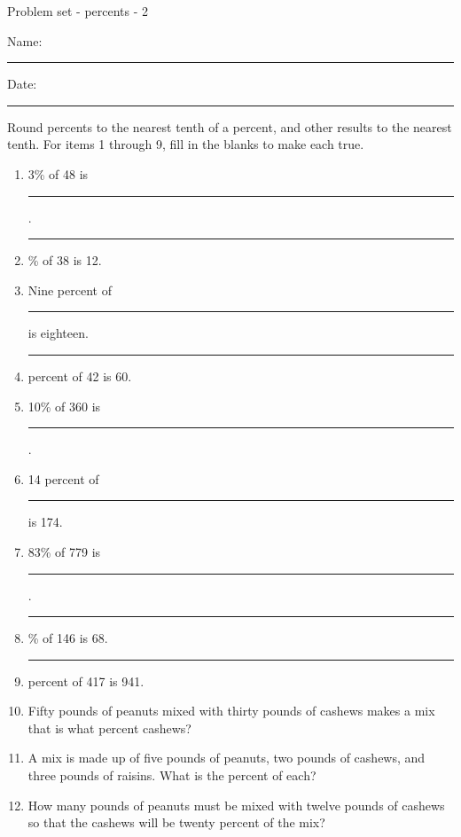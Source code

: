 \documentclass[12pt]{article}
\begin{document}
\pagestyle{empty} %
\begin{center}
          Problem set - percents - 2 \\[0.5in]
\end{center}
Name: \rule{4.5in}{0.005in} Date: \rule{1in}{0.005in} 
  \vspace{0.25in}

Round percents to the nearest tenth of a percent, and other results to the nearest tenth. For items 1 through 9, fill in the blanks to make each true. 

\begin{enumerate}
		\newcommand{\spacing}{\vspace{0.50in}}

\item 3\% of 48 is \rule{0.5in}{0.005in}.
  \spacing

\item \rule{0.5in}{0.005in}\% of 38 is 12.
  \spacing

\item Nine percent of \rule{1.5in}{0.005in} is eighteen.
  \spacing

\item \rule{0.5in}{0.005in} percent of 42 is 60.
  \spacing

\item 10\% of 360 is \rule{0.5in}{0.005in}.
  \spacing

\item 14 percent of \rule{0.5in}{0.005in} is 174.
  \spacing

\item 83\% of 779 is \rule{0.5in}{0.005in}.
  \spacing

\item \rule{0.5in}{0.005in}\% of 146 is 68.
  \spacing

\item \rule{0.5in}{0.005in} percent of 417 is 941.
  \spacing

\item Fifty pounds of peanuts mixed with thirty pounds of cashews makes a mix that is what percent cashews? 
  \spacing

\item A mix is made up of five pounds of peanuts, two pounds of cashews, and three pounds of raisins. What is the percent of each? 
  \spacing

\item How many pounds of peanuts must be mixed with twelve pounds of cashews so that the cashews will be twenty percent of the mix? 
  \spacing


\end{enumerate}
\end{document}
